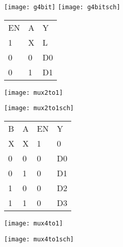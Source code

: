 
\begin{center}
  \texttt{[image: g4bit]}    
  \texttt{[image: g4bitsch]}
\end{center}


\begin{center}
\begin{tabular}{lll}
EN & A & Y \\  
1 & X & L \\ 
0 & 0 & D0 \\ 
0 & 1 & D1
\end{tabular} 
\end{center}

\begin{center}
\texttt{[image: mux2to1]}
\end{center}
\vspace{10mm}
\begin{center}
\texttt{[image: mux2to1sch]}
\end{center}


\vspace{5mm}
\begin{center}
\begin{tabular}{llll}
B & A & EN & Y \\ 
X & X & 1 & 0 \\ 
0 & 0 & 0 & D0 \\ 
0 & 1 & 0 & D1 \\ 
1 & 0 & 0 & D2 \\ 
1 & 1 & 0 & D3
\end{tabular}
\end{center}
\vspace{2mm}
\begin{center}
\texttt{[image: mux4to1]}
\end{center}
\begin{center}
  \texttt{[image: mux4to1sch]}
\end{center}

